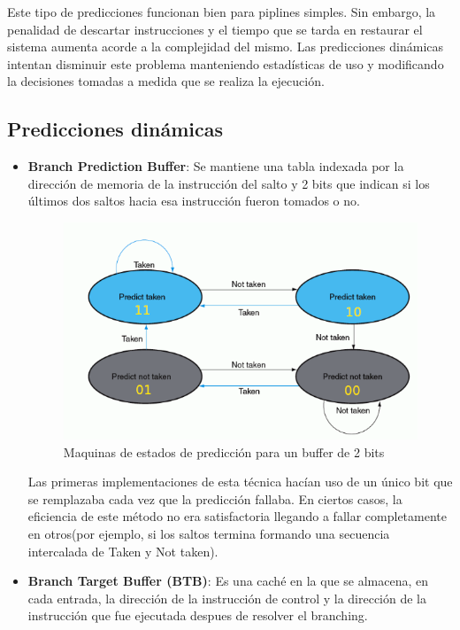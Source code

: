 Este tipo de predicciones funcionan bien para piplines simples. Sin embargo, la penalidad de descartar instrucciones y el tiempo que se tarda en restaurar el sistema aumenta acorde a la complejidad del mismo. Las predicciones dinámicas intentan disminuir este problema manteniendo estadísticas de uso y modificando la decisiones tomadas a medida que se realiza la ejecución.

\subsection{Predicciones dinámicas}

\begin{itemize}
	\item\textbf{Branch Prediction Buffer}: Se mantiene una tabla indexada por la dirección de memoria de la instrucción del salto y 2 bits que indican si los últimos dos saltos hacia esa instrucción fueron tomados o no.
	
	\begin{figure}[ht]
		\centering
		\includegraphics[width=0.7\linewidth]{imagenes/2bit-buffer-prediction}
		\caption{Maquinas de estados de predicción para un buffer de 2 bits}
		\label{fig:2bit-buffer-prediction}
	\end{figure}

	Las primeras implementaciones de esta técnica hacían uso de un único bit que se remplazaba cada vez que la predicción fallaba. En ciertos casos, la eficiencia de este método no era satisfactoria llegando a fallar completamente en otros(por ejemplo, si los saltos termina formando una secuencia intercalada de Taken y Not taken).
	
	\item \textbf{Branch Target Buffer (BTB)}: Es una caché en la que se almacena, en cada entrada, la dirección de la instrucción de control y la dirección de la instrucción que fue ejecutada despues de resolver el branching.
	

\end{itemize}
